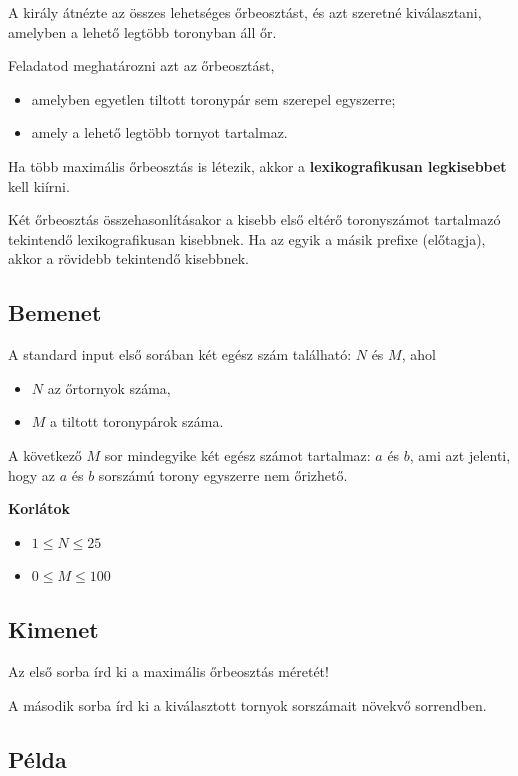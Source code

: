 \documentclass[12pt,a4paper]{article}
\begin{document}
A király átnézte az összes lehetséges őrbeosztást, és azt szeretné kiválasztani, amelyben a lehető legtöbb toronyban áll őr.

Feladatod meghatározni azt az őrbeosztást,

\begin{itemize}
    \item amelyben egyetlen tiltott toronypár sem szerepel egyszerre;
    \item amely a lehető legtöbb tornyot tartalmaz.
\end{itemize}

Ha több maximális őrbeosztás is létezik, akkor a
\textbf{lexikografikusan legkisebbet} kell kiírni.

Két őrbeosztás összehasonlításakor a kisebb első eltérő toronyszámot tartalmazó tekintendő lexikografikusan kisebbnek. Ha az egyik a másik prefixe (előtagja), akkor a rövidebb tekintendő kisebbnek.

\subsection*{Bemenet}

A standard input első sorában két egész szám található: $N$ és $M$,
ahol

\begin{itemize}
    \item $N$ az őrtornyok száma,
    \item $M$ a tiltott toronypárok száma.
\end{itemize}

A következő $M$ sor mindegyike két egész számot tartalmaz: $a$ és $b$, ami azt jelenti, hogy az $a$ és $b$ sorszámú torony egyszerre nem őrizhető.

\textbf{Korlátok}

\begin{itemize}
    \item $1 \le N \le 25$
    \item $0 \le M \le 100$
\end{itemize}

\subsection*{Kimenet}

Az első sorba írd ki a maximális őrbeosztás méretét!

A második sorba írd ki a kiválasztott tornyok sorszámait növekvő sorrendben.

\subsection*{Példa}
\end{document}
